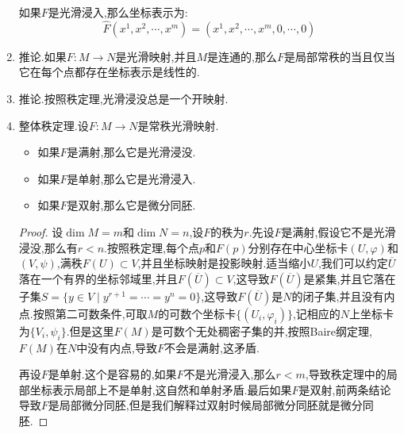 \begin{enumerate}
    如果$F$是光滑浸入,那么坐标表示为:
    $$\hat{F}(x^1,x^2,\cdots,x^m)=(x^1,x^2,\cdots,x^m,0,\cdots,0)$$
    \item 推论.如果$F:M\to N$是光滑映射,并且$M$是连通的,那么$F$是局部常秩的当且仅当它在每个点都存在坐标表示是线性的.
    \item 推论.按照秩定理,光滑浸没总是一个开映射.
    \item 整体秩定理.设$F:M\to N$是常秩光滑映射.
    \begin{itemize}
    	\item 如果$F$是满射,那么它是光滑浸没.
    	\item 如果$F$是单射,那么它是光滑浸入.
    	\item 如果$F$是双射,那么它是微分同胚.
    \end{itemize}
    \begin{proof}
    	
    	设$\dim M=m$和$\dim N=n$,设$F$的秩为$r$.先设$F$是满射,假设它不是光滑浸没,那么有$r<n$.按照秩定理,每个点$p$和$F(p)$分别存在中心坐标卡$(U,\varphi)$和$(V,\psi)$,满秩$F(U)\subset V$,并且坐标映射是投影映射.适当缩小$U$,我们可以约定$\overline{U}$落在一个有界的坐标邻域里,并且$F(\overline{U})\subset V$,这导致$F(\overline{U})$是紧集,并且它落在子集$S=\{y\in V\mid y^{r+1}=\cdots=y^n=0\}$,这导致$F(\overline{U})$是$N$的闭子集,并且没有内点.按照第二可数条件,可取$M$的可数个坐标卡$\{(U_i,\varphi_i)\}$,记相应的$N$上坐标卡为$\{V_i,\psi_i\}$.但是这里$F(M)$是可数个无处稠密子集的并,按照Baire纲定理,$F(M)$在$N$中没有内点,导致$F$不会是满射,这矛盾.
    	
    	\qquad
    	
    	再设$F$是单射.这个是容易的,如果$F$不是光滑浸入,那么$r<m$,导致秩定理中的局部坐标表示局部上不是单射,这自然和单射矛盾.最后如果$F$是双射,前两条结论导致$F$是局部微分同胚,但是我们解释过双射时候局部微分同胚就是微分同胚.
    \end{proof}
\end{enumerate}

